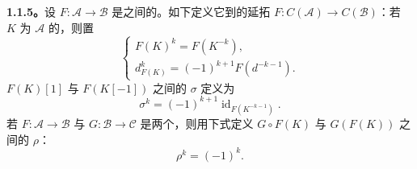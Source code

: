 \textbf{1.1.5。}设 $F:\mathcal A\to\mathcal B$ 是之间的。如下定义它到的延拓 $F:C(\mathcal A)\to C(\mathcal B)$：若 $K$ 为 $\mathcal A$ 的，则置
\[
\begin{cases}
F(K)^k=F(K^{-k}),\\
d_{F(K)}^k=(-1)^{k+1}F(d^{-k-1}).
\end{cases}\tag{1.1.5.1}
\]
$F(K)[1]$ 与 $F(K[-1])$ 之间的 $\sigma$ 定义为
\[
\sigma^k=(-1)^{k+1}\operatorname{id}_{F(K^{-k-1})}.\tag{1.1.5.2}
\]
若 $F:\mathcal A\to\mathcal B$ 与 $G:\mathcal B\to\mathcal C$ 是两个，则用下式定义 $G\circ F(K)$ 与 $G(F(K))$ 之间的 $\rho$：
\[
\rho^k=(-1)^k.\tag{1.1.5.3}
\]

